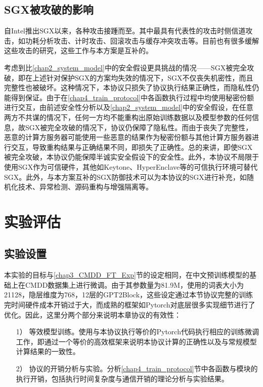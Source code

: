 \subsection{SGX被攻破的影响}

自Intel推出SGX以来，各种攻击接踵而至。其中最具有代表性的攻击时侧信道攻击，如功耗分析攻击、计时攻击、回滚攻击与缓存冲突攻击等\cite{SGX_Exposure, High_Resolution_Side_Channels, Cache_Attack_SGX, CacheZoom, SGX_Cache, mem_side_hazard, PMFaultFA, VoltJockeyAN}。目前也有很多缓解这些攻击的研究\cite{Oblix, Detecting_privileged_side_channel_attacks, Sanctum, Strong_and_Efficient_Cache_Side_Channel_Protection, T-SGX, minefield, MoLEMO, RepurposingSA}，这些工作与本方案是互补的。

考虑到比\ref{chap2_system_model}中的安全假设更具挑战的情况——SGX被完全攻破，即在上述针对保护SGX的方案均失效的情况下，SGX不仅丧失机密性，而且完整性也被破坏。这种情况下，本协议只损失了协议执行结果正确性，而隐私性仍能得到保证。由于在\ref{chap4_train_protocol}中各函数执行过程中均使用秘密份额进行交互，由前述安全性分析以及\ref{chap2_system_model}中的安全假设，在任意两方不共谋的情况下，任何一方均不能重构出原始训练数据以及模型参数的任何信息，故SGX被完全攻破的情况下，协议仍保障了隐私性。而由于丧失了完整性，恶意的计算方服务器可能使用一些恶意的结果作为秘密份额与其他计算方服务器进行交互，导致重构结果与正确结果不同，即损失了正确性。总的来讲，即使SGX被完全攻破，本协议仍能保障半诚实安全假设下的安全性。此外，本协议不局限于使用SGX作为可信硬件，其他如Keytone\cite{keystone}、HyperEnclave\cite{hyperenclave}等的可信执行环境可替代SGX。此外，与本方案互补的SGX防御技术可以为本协议的SGX进行补充，如随机化技术、异常检测、源码重构与增强隔离等。

\section{实验评估}

\subsection{实验设置} \label{chap4_exp_setting}


本实验的目标与\ref{chap3_CMDD_FT_Exp}节的设定相同，在中文预训练模型的基础上在CMDD数据集上进行微调。由于其参数量为81.9M，使用的词表大小为21128，隐层维度为768，12层的GPT2Block，这些设定通过本节协议完整的训练完时间硬件成本开销过于大，而成熟的框架如Pytorch对底层很多实现细节进行了优化。因此，这里分两个部分来说明本章协议的有效性：

\begin{itemize}
	\item[1）]等效模型训练。使用与本协议执行等价的Pytorch代码执行相应的训练微调工作，即通过一个等价的高效框架来说明本协议计算的正确性以及与常规模型计算结果的一致性。
	\item[2）]协议的开销分析与实验。分析\ref{chap4_train_protocol}节中各函数与模块的执行开销，包括执行时间复杂度与通信开销的理论分析与实验结果。
\end{itemize}

